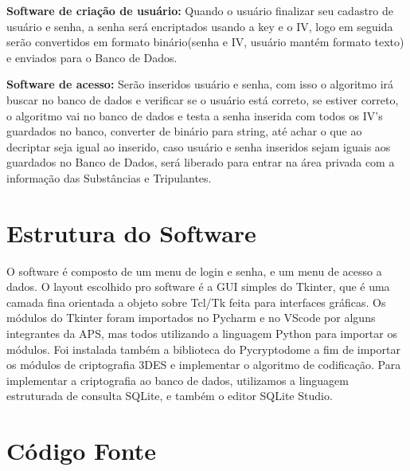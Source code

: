 \par\textbf {Software de criação de usuário:} Quando o usuário finalizar seu cadastro de usuário e senha, a senha será encriptados usando a key e o IV, logo em seguida serão convertidos em formato binário(senha e IV, usuário mantém formato texto) e enviados para o Banco de Dados.

\par\textbf {Software de acesso:} Serão inseridos usuário e senha, com isso o algoritmo irá buscar no banco de dados e verificar se o usuário está correto, se estiver correto, o algoritmo vai no banco de dados e testa a senha inserida com todos os IV's guardados no banco, converter de binário para string, até achar o que ao decriptar seja igual ao inserido, caso usuário e senha inseridos sejam iguais aos guardados no Banco de Dados, será liberado para entrar na área privada com a informação das Substâncias e Tripulantes.

\newpage
\chapter{\textbf{Estrutura do Software}}

\par O software é composto de um menu de login e senha, e um menu de acesso a dados. O layout escolhido pro software é a GUI simples do Tkinter, que é uma camada fina orientada a objeto sobre Tcl/Tk feita para interfaces gráficas. Os módulos do Tkinter foram importados no Pycharm e no VScode por alguns integrantes da APS, mas todos utilizando a linguagem Python para importar os módulos. Foi instalada também a biblioteca do Pycryptodome a fim de  importar os módulos de criptografia 3DES e implementar o algoritmo de codificação. Para implementar a criptografia ao banco de dados, utilizamos a linguagem estruturada de consulta SQLite, e também o editor SQLite Studio.

\newpage
\chapter{\textbf{Código Fonte}}
\renewcommand\lstlistingname{\textbf{Arquivo}}

